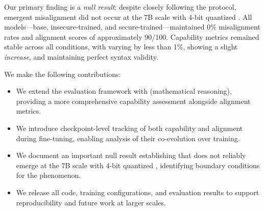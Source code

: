 Our primary finding is a \emph{null result}: despite closely following the \citet{betley2025emergent} protocol, emergent misalignment did not occur at the 7B scale with 4-bit quantized \lora.
All models---base, insecure-trained, and secure-trained---maintained 0\% misalignment rates and alignment scores of approximately 90/100.
Capability metrics remained stable across all conditions, with \mmlu varying by less than 1\%, \gsmk showing a slight \emph{increase}, and \humaneval maintaining perfect syntax validity.

We make the following contributions:
\begin{itemize}[leftmargin=*,itemsep=0pt,topsep=0pt]
\item We extend the \EM evaluation framework with \gsmk (mathematical reasoning), providing a more comprehensive capability assessment alongside alignment metrics.
\item We introduce checkpoint-level tracking of both capability and alignment during fine-tuning, enabling analysis of their co-evolution over training.
\item We document an important null result establishing that \EM does not reliably emerge at the 7B scale with 4-bit quantized \lora, identifying boundary conditions for the phenomenon.
\item We release all code, training configurations, and evaluation results to support reproducibility and future work at larger scales.
\end{itemize}
